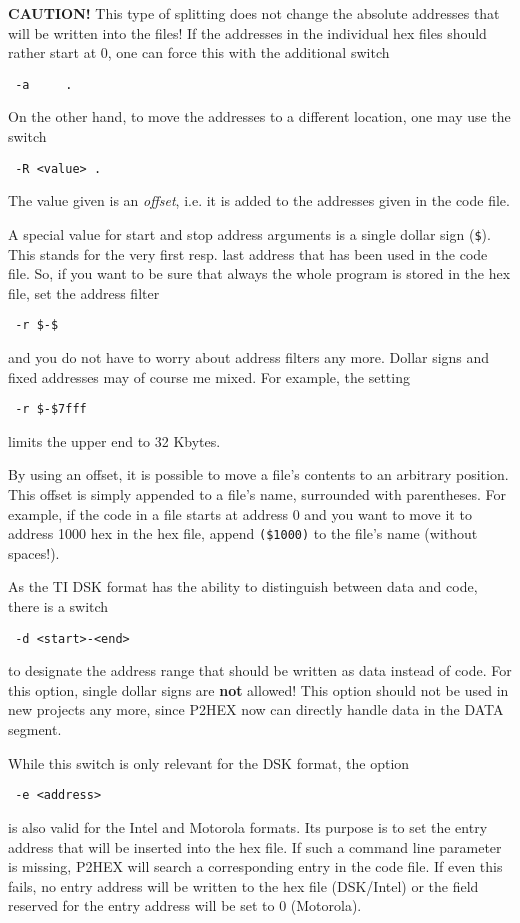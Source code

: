 \documentclass[12pt,twoside]{report}
\newcommand{\bb}[1]{{\bf #1}}
\newcommand{\tty}[1]{{\tt #1}}
\begin{document}
\bb{CAUTION!} This type of splitting does not change the absolute
addresses that will be written into the files!  If the addresses in
the individual hex files should rather start at 0, one can force this
with the additional switch
\begin{verbatim}
 -a     .
\end{verbatim}
On the other hand, to move the addresses to a different location, one may
use the switch
\begin{verbatim}
 -R <value> .
\end{verbatim}
The value given is an {\em offset}, i.e. it is added to the addresses
given in the code file.
\par
A special value for start and stop address arguments is a single
dollar sign (\tty{\$}).  This stands for the very first resp. last address
that has been used in the code file.  So, if you want to be sure
that always the whole program is stored in the hex file, set the
address filter
\begin{verbatim}
 -r $-$
\end{verbatim}
and you do not have to worry about address filters any more.  Dollar
signs and fixed addresses may of course me mixed.  For example, the
setting
\begin{verbatim}
 -r $-$7fff
\end{verbatim}
limits the upper end to 32 Kbytes. 

By using an offset, it is possible to move a file's contents to an
arbitrary position.  This offset is simply appended to a file's name,
surrounded with parentheses.  For example, if the code in a file
starts at address 0 and you want to move it to address 1000 hex in the
hex file, append \tty{(\$1000)} to the file's name (without spaces!).

As the TI DSK format has the ability to distinguish between data and
code, there is a switch
\begin{verbatim}
 -d <start>-<end>
\end{verbatim}
to designate the address range that should be written as data instead
of code.  For this option, single dollar signs are \bb{not} allowed!  This
option should not be used in new projects any more, since P2HEX now can
directly handle data in the DATA segment.

While this switch is only relevant for the DSK format, the option
\begin{verbatim}
 -e <address>
\end{verbatim}
is also valid for the Intel and Motorola formats.  Its purpose is to
set the entry address that will be inserted into the hex file.  If
such a command line parameter is missing, P2HEX will search a
corresponding entry in the code file.  If even this fails, no entry
address will be written to the hex file (DSK/Intel) or the field
reserved for the entry address will be set to 0 (Motorola).
\end{document}
